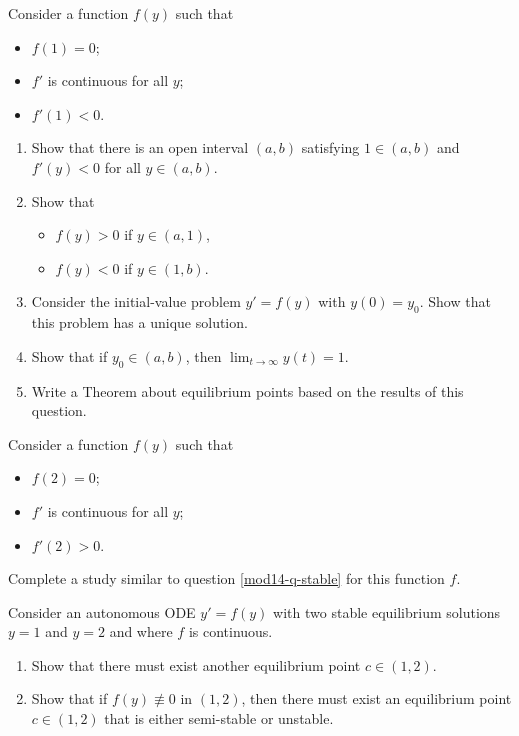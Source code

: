 \begin{exercises}
\begin{problist}
	\prob \label{mod14-q-stable}Consider a function $f(y)$ such that
	\begin{itemize}
		\item $f(1)=0$;
		\item $f'$ is continuous for all $y$;
		\item $f'(1)<0$.
	\end{itemize}
	\begin{enumerate}
		\item Show that there is an open interval $(a,b)$ satisfying $1 \in (a,b)$ and $f'(y)<0$ for all $y \in (a,b)$.
		\item Show that %
		\begin{itemize}
			\item $f(y)>0$ if $y \in (a,1)$, %
			\item $f(y)<0$ if $y \in (1,b)$. %
		\end{itemize}
		\item Consider the initial-value problem $y'=f(y)$ with $y(0)=y_0$. Show that this problem has a unique solution.
		\item Show that if $y_0 \in (a,b)$, then $\displaystyle \lim_{t \to \infty} y(t) = 1$.
		\item Write a Theorem about equilibrium points based on the results of this question.
	\end{enumerate}


	\prob Consider a function $f(y)$ such that
	\begin{itemize}
		\item $f(2)=0$;
		\item $f'$ is continuous for all $y$;
		\item $f'(2)>0$.
	\end{itemize}
	
	Complete a study similar to question \ref{mod14-q-stable} for this function $f$.
	
	
	
	\prob Consider an autonomous ODE $y'=f(y)$ with two stable equilibrium solutions $y=1$ and $y=2$ and where $f$ is continuous.
	\begin{enumerate}
		\item Show that there must exist another equilibrium point $c \in (1,2)$.
		\item Show that if $f(y)\not\equiv 0$ in $(1,2)$, then there must exist an equilibrium point $c \in (1,2)$ that is either semi-stable or unstable.
	\end{enumerate}

	\end{problist}
\end{exercises}